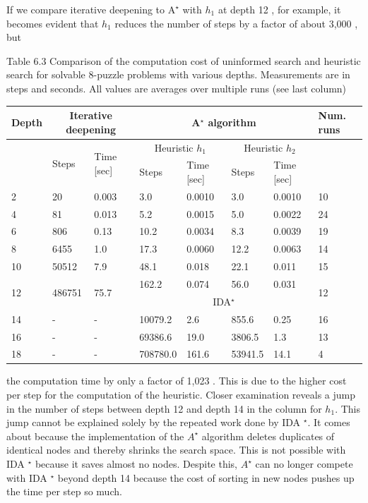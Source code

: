 \documentclass[10pt]{book}
\begin{document}
If we compare iterative deepening to $\mathrm{A}^{\star}$ with $h_{1}$ at depth 12 , for example, it becomes evident that $h_{1}$ reduces the number of steps by a factor of about 3,000 , but

Table 6.3 Comparison of the computation cost of uninformed search and heuristic search for solvable 8-puzzle problems with various depths. Measurements are in steps and seconds. All values are averages over multiple runs (see last column)

\begin{center}
\begin{tabular}{|l|l|l|l|l|l|l|l|}
\hline
\multirow[t]{3}{*}{Depth} & \multicolumn{2}{|c|}{Iterative deepening} & \multicolumn{4}{|c|}{A$^{\star}$ algorithm} & \multirow[t]{3}{*}{Num. runs} \\
\hline
 & \multirow[t]{2}{*}{Steps} & \multirow{2}{*}{Time [sec]} & \multicolumn{2}{|c|}{Heuristic $h_{1}$} & \multicolumn{2}{|c|}{Heuristic $h_{2}$} &  \\
\hline
 &  &  & Steps & Time [sec] & Steps & Time [sec] &  \\
\hline
2 & 20 & 0.003 & 3.0 & 0.0010 & 3.0 & 0.0010 & 10 \\
\hline
4 & 81 & 0.013 & 5.2 & 0.0015 & 5.0 & 0.0022 & 24 \\
\hline
6 & 806 & 0.13 & 10.2 & 0.0034 & 8.3 & 0.0039 & 19 \\
\hline
8 & 6455 & 1.0 & 17.3 & 0.0060 & 12.2 & 0.0063 & 14 \\
\hline
10 & 50512 & 7.9 & 48.1 & 0.018 & 22.1 & 0.011 & 15 \\
\hline
\multirow[t]{2}{*}{12} & \multirow[t]{2}{*}{486751} & \multirow[t]{2}{*}{75.7} & 162.2 & 0.074 & 56.0 & 0.031 & \multirow[t]{2}{*}{12} \\
\hline
 &  &  & \multicolumn{4}{|c|}{IDA$^{\star}$} &  \\
\hline
14 & - & - & 10079.2 & 2.6 & 855.6 & 0.25 & 16 \\
\hline
16 & - & - & 69386.6 & 19.0 & 3806.5 & 1.3 & 13 \\
\hline
18 & - & - & 708780.0 & 161.6 & 53941.5 & 14.1 & 4 \\
\hline
\end{tabular}
\end{center}

the computation time by only a factor of 1,023 . This is due to the higher cost per step for the computation of the heuristic.
Closer examination reveals a jump in the number of steps between depth 12 and depth 14 in the column for $h_{1}$. This jump cannot be explained solely by the repeated work done by IDA ${ }^{\star}$. It comes about because the implementation of the $A^{\star}$ algorithm deletes duplicates of identical nodes and thereby shrinks the search space. This is not possible with IDA ${ }^{\star}$ because it saves almost no nodes. Despite this, $A^{\star}$ can no longer compete with IDA ${ }^{\star}$ beyond depth 14 because the cost of sorting in new nodes pushes up the time per step so much.
\end{document}
